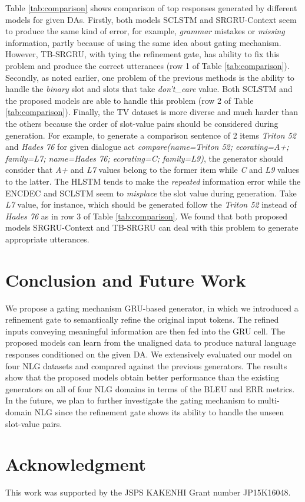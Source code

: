 \documentclass{llncs}
\begin{document}
Table \ref{tab:comparison} shows comparison of top responses generated by different models for given DAs. Firstly, both models SCLSTM and SRGRU-Context seem to produce the same kind of error, for example, \textit{grammar} mistakes or \textit{missing} information, partly because of using the same idea about gating mechanism. However, TB-SRGRU, with tying the refinement gate, has ability to fix this problem and produce the correct utterances (row 1 of Table \ref{tab:comparison}). Secondly, as noted earlier, one problem of the previous methods is the ability to handle the \textit{binary} slot and slots that take \textit{don't\_care} value. Both SCLSTM and the proposed models are able to handle this problem (row 2 of Table \ref{tab:comparison}). Finally, the TV dataset is more diverse and much harder than the others because the order of slot-value pairs should be considered during generation. 
For example, to generate a comparison sentence of 2 items \textit{Triton 52} and \textit{Hades 76} for given dialogue act \textit{compare(name=Triton 52; ecorating=A+; family=L7; name=Hades 76; ecorating=C; family=L9)}, the generator should consider that \textit{A+} and \textit{L7} values belong to the former item while \textit{C} and \textit{L9} values to the latter. 
The HLSTM tends to make the \textit{repeated} information error while the ENCDEC and SCLSTM seem to \textit{misplace} the slot value during generation. Take \textit{L7} value, for instance, which should be generated follow the \textit{Triton 52} instead of \textit{Hades 76} as in row 3 of Table \ref{tab:comparison}. We found that both proposed models SRGRU-Context and TB-SRGRU can deal with this problem to generate appropriate utterances.

\section{Conclusion and Future Work}\label{sec:conclusion}
We propose a gating mechanism GRU-based generator, in which we introduced a refinement gate to semantically refine the original input tokens. The refined inputs conveying meaningful information are then fed into the GRU cell. The proposed models can learn from the unaligned data to produce natural language responses conditioned on the given DA. We extensively evaluated our model on four NLG datasets and compared against the previous generators. The results show that the proposed models obtain better performance than the existing generators on all of four NLG domains in terms of the BLEU and ERR metrics. In the future, we plan to further investigate the gating mechanism to multi-domain NLG since the refinement gate shows its ability to handle the unseen slot-value pairs.

\section*{Acknowledgment}
This work was supported by the JSPS KAKENHI Grant number JP15K16048.


\end{document}
